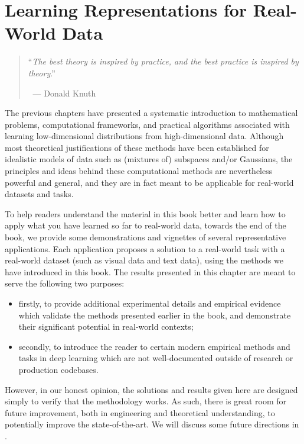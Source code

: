 \documentclass[../../book-main.tex]{subfiles}
\begin{document}
\chapter{Learning Representations for Real-World Data}
\label{ch:applications}

\begin{quote}
\hfill    ``{\em The best theory is inspired by practice, and the best practice is inspired by theory}.''

$~$ \hfill --- Donald Knuth   
\end{quote}
\vspace{5mm}

The previous chapters have presented a systematic introduction to mathematical problems, computational frameworks, and practical algorithms associated with learning low-dimensional distributions from high-dimensional data. Although most theoretical justifications of these methods have been established for idealistic models of data such as (mixtures of) subspaces and/or Gaussians, the principles and ideas behind these computational methods are nevertheless powerful and general, and they are in fact meant to be applicable for real-world datasets and tasks. 

To help readers understand the material in this book better and learn how to apply what you have learned so far to real-world data, towards the end of the book, we provide some demonstrations and vignettes of several representative applications. Each application proposes a solution to a real-world task with a real-world dataset (such as visual data and text data), using the methods we have introduced in this book. The results presented in this chapter are meant to serve the following two purposes: 
\begin{itemize}
    \item firstly, to provide additional experimental details and empirical evidence which validate the methods presented earlier in the book, and demonstrate their significant potential in real-world contexts;
    \item secondly, to introduce the reader to certain modern empirical methods and tasks in deep learning which are not well-documented outside of research or production codebases.
\end{itemize}
However, in our honest opinion, the solutions and results given here are designed simply to verify that the methodology works. As such, there is great room for future improvement, both in engineering and theoretical understanding, to potentially improve the state-of-the-art. We will discuss some future directions in .  
\end{document}
